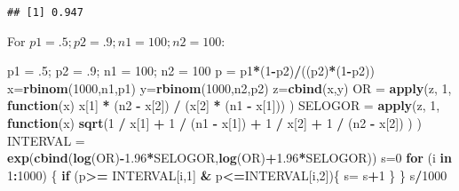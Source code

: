 \documentclass[]{article}
\newenvironment{Shaded}{\begin{snugshade}}{\end{snugshade}}
\newcommand{\KeywordTok}[1]{\textcolor[rgb]{0.13,0.29,0.53}{\textbf{#1}}}
\newcommand{\DecValTok}[1]{\textcolor[rgb]{0.00,0.00,0.81}{#1}}
\newcommand{\FloatTok}[1]{\textcolor[rgb]{0.00,0.00,0.81}{#1}}
\newcommand{\StringTok}[1]{\textcolor[rgb]{0.31,0.60,0.02}{#1}}
\newcommand{\ControlFlowTok}[1]{\textcolor[rgb]{0.13,0.29,0.53}{\textbf{#1}}}
\newcommand{\OperatorTok}[1]{\textcolor[rgb]{0.81,0.36,0.00}{\textbf{#1}}}
\newcommand{\NormalTok}[1]{#1}
\begin{document}
\begin{verbatim}
## [1] 0.947
\end{verbatim}

For \(p1 = .5; p2 = .9; n1 = 100; n2 = 100\):

\begin{Shaded}
\begin{Highlighting}[]
\NormalTok{p1 =}\StringTok{ }\NormalTok{.}\DecValTok{5}\NormalTok{; p2 =}\StringTok{ }\NormalTok{.}\DecValTok{9}\NormalTok{; n1 =}\StringTok{ }\DecValTok{100}\NormalTok{; n2 =}\StringTok{ }\DecValTok{100}
\NormalTok{p =}\StringTok{ }\NormalTok{p1}\OperatorTok{*}\NormalTok{(}\DecValTok{1}\OperatorTok{-}\NormalTok{p2)}\OperatorTok{/}\NormalTok{((p2)}\OperatorTok{*}\NormalTok{(}\DecValTok{1}\OperatorTok{-}\NormalTok{p2))}
\NormalTok{x=}\KeywordTok{rbinom}\NormalTok{(}\DecValTok{1000}\NormalTok{,n1,p1)}
\NormalTok{y=}\KeywordTok{rbinom}\NormalTok{(}\DecValTok{1000}\NormalTok{,n2,p2)}
\NormalTok{z=}\KeywordTok{cbind}\NormalTok{(x,y)}
\NormalTok{OR =}\StringTok{ }\KeywordTok{apply}\NormalTok{(z, }\DecValTok{1}\NormalTok{, }\ControlFlowTok{function}\NormalTok{(x) x[}\DecValTok{1}\NormalTok{] }\OperatorTok{*}\StringTok{ }\NormalTok{(n2 }\OperatorTok{-}\StringTok{ }\NormalTok{x[}\DecValTok{2}\NormalTok{]) }\OperatorTok{/}\StringTok{ }\NormalTok{(x[}\DecValTok{2}\NormalTok{] }\OperatorTok{*}\StringTok{ }\NormalTok{(n1 }\OperatorTok{-}\StringTok{ }\NormalTok{x[}\DecValTok{1}\NormalTok{])) )}
\NormalTok{SELOGOR =}\StringTok{ }\KeywordTok{apply}\NormalTok{(z, }\DecValTok{1}\NormalTok{, }\ControlFlowTok{function}\NormalTok{(x) }\KeywordTok{sqrt}\NormalTok{(}\DecValTok{1} \OperatorTok{/}\StringTok{ }\NormalTok{x[}\DecValTok{1}\NormalTok{] }\OperatorTok{+}\StringTok{ }\DecValTok{1} \OperatorTok{/}\StringTok{ }\NormalTok{(n1 }\OperatorTok{-}\StringTok{ }\NormalTok{x[}\DecValTok{1}\NormalTok{]) }\OperatorTok{+}\StringTok{ }\DecValTok{1} \OperatorTok{/}\StringTok{ }\NormalTok{x[}\DecValTok{2}\NormalTok{] }\OperatorTok{+}\StringTok{ }\DecValTok{1} \OperatorTok{/}\StringTok{ }\NormalTok{(n2 }\OperatorTok{-}\StringTok{ }\NormalTok{x[}\DecValTok{2}\NormalTok{]) ) )}
\NormalTok{INTERVAL =}\StringTok{ }\KeywordTok{exp}\NormalTok{(}\KeywordTok{cbind}\NormalTok{(}\KeywordTok{log}\NormalTok{(OR)}\OperatorTok{-}\FloatTok{1.96}\OperatorTok{*}\NormalTok{SELOGOR,}\KeywordTok{log}\NormalTok{(OR)}\OperatorTok{+}\FloatTok{1.96}\OperatorTok{*}\NormalTok{SELOGOR))}
\NormalTok{s=}\DecValTok{0}
\ControlFlowTok{for}\NormalTok{ (i }\ControlFlowTok{in} \DecValTok{1}\OperatorTok{:}\DecValTok{1000}\NormalTok{) \{}
  \ControlFlowTok{if}\NormalTok{ (p}\OperatorTok{>=}\StringTok{ }\NormalTok{INTERVAL[i,}\DecValTok{1}\NormalTok{] }\OperatorTok{&}\StringTok{ }\NormalTok{p}\OperatorTok{<=}\NormalTok{INTERVAL[i,}\DecValTok{2}\NormalTok{])\{}
\NormalTok{    s=}\StringTok{ }\NormalTok{s}\OperatorTok{+}\DecValTok{1}
\NormalTok{  \}}
\NormalTok{\}}
\NormalTok{s}\OperatorTok{/}\DecValTok{1000}
\end{Highlighting}
\end{Shaded}
\end{document}

